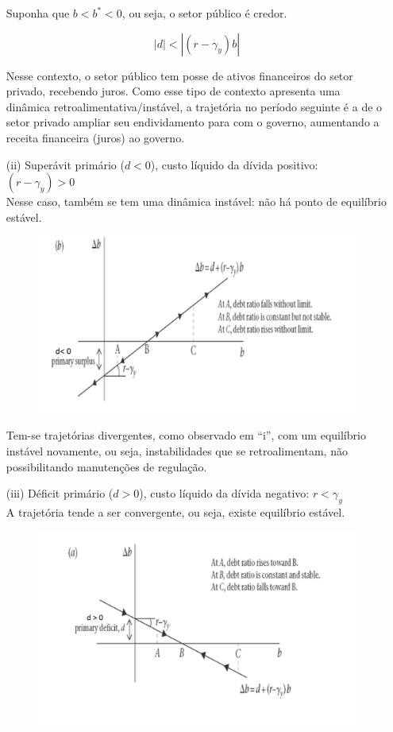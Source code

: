 \documentclass[a4paper,12pt]{article}[abntex2]
\begin{document}
\begin{itemize}
Suponha que \(b < b^* < 0\), ou seja, o setor público é credor.

\[
|d| < |(r - \gamma_y) b|
\]

Nesse contexto, o setor público tem posse de ativos financeiros do setor privado, recebendo juros. 
Como esse tipo de contexto apresenta uma dinâmica retroalimentativa/instável, a trajetória no período seguinte é a de o setor privado ampliar seu endividamento para com o governo, aumentando a receita financeira (juros) ao governo.


  \item[(ii)] Superávit primário ($d < 0$), custo líquido da dívida positivo: $(r - \gamma_y) > 0$ \\
  Nesse caso, também se tem uma dinâmica instável: não há ponto de equilíbrio estável.
  
\begin{figure}[H]
    \centering
    \includegraphics[width=0.7\linewidth]{Imagens/a18i7.png}
\end{figure}

Tem-se trajetórias divergentes, como observado em “i”, com um equilíbrio instável novamente, ou seja, instabilidades que se retroalimentam, não possibilitando manutenções de regulação.

  \item[(iii)] Déficit primário ($d > 0$), custo líquido da dívida negativo: $r < \gamma_y$ \\
  A trajetória tende a ser convergente, ou seja, existe equilíbrio estável.

\begin{figure}[H]
    \centering
    \includegraphics[width=0.7\linewidth]{Imagens/a18i8.png}
\end{figure}


\end{itemize}
\end{document}

